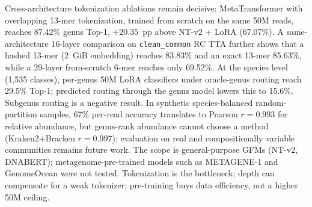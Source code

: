 \begin{abstract*}
    Cross-architecture tokenization ablations remain decisive: MetaTransformer with overlapping 13-mer tokenization, trained from scratch on the same 50M reads, reaches 87.42\% genus Top-1, $+20.35$~pp above NT-v2 + LoRA (67.07\%). A same-architecture 16-layer comparison on \texttt{clean\_common} RC TTA further shows that a hashed 13-mer (2~GiB embedding) reaches 83.83\% and an exact 13-mer 85.63\%, while a 29-layer from-scratch 6-mer reaches only 69.52\%. At the species level (1,535 classes), per-genus 50M LoRA classifiers under oracle-genus routing reach 29.5\% Top-1; predicted routing through the genus model lowers this to 15.6\%. Subgenus routing is a negative result. In synthetic species-balanced random-partition samples, 67\% per-read accuracy translates to Pearson $r = 0.993$ for relative abundance, but genus-rank abundance cannot choose a method (Kraken2+Bracken $r = 0.997$); evaluation on real and compositionally variable communities remains future work. The scope is general-purpose GFMs (NT-v2, DNABERT); metagenome-pre-trained models such as METAGENE-1 and GenomeOcean were not tested. Tokenization is the bottleneck; depth can compensate for a weak tokenizer; pre-training buys data efficiency, not a higher 50M ceiling.

\end{abstract*}
